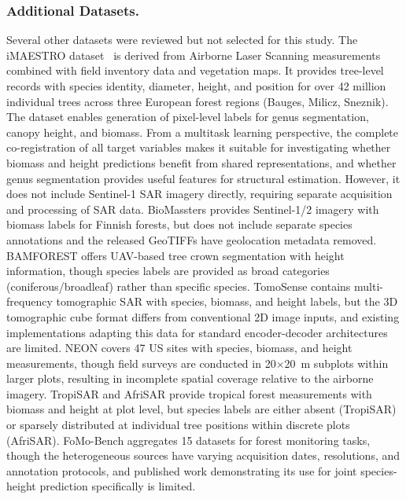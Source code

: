 \subsubsection{Additional Datasets.} 
Several other datasets were reviewed but not selected for this study. The iMAESTRO dataset~\cite{aussenac_diameter_2023} is derived from Airborne Laser Scanning measurements combined with field inventory data and vegetation maps. It provides tree-level records with species identity, diameter, height, and position for over 42 million individual trees across three European forest regions (Bauges, Milicz, Sneznik). The dataset enables generation of pixel-level labels for genus segmentation, canopy height, and biomass. From a multitask learning perspective, the complete co-registration of all target variables makes it suitable for investigating whether biomass and height predictions benefit from shared representations, and whether genus segmentation provides useful features for structural estimation. However, it does not include Sentinel-1 SAR imagery directly, requiring separate acquisition and processing of SAR data. BioMassters \cite{andrea_nascetti_biomassters_nodate} provides Sentinel-1/2 imagery with biomass labels for Finnish forests, but does not include separate species annotations and the released GeoTIFFs have geolocation metadata removed. BAMFOREST \cite{troles_bamforests_2024} offers UAV-based tree crown segmentation with height information, though species labels are provided as broad categories (coniferous/broadleaf) rather than specific species. TomoSense \cite{tebaldini_tomosense_2023} contains multi-frequency tomographic SAR with species, biomass, and height labels, but the 3D tomographic cube format differs from conventional 2D image inputs, and existing implementations adapting this data for standard encoder-decoder architectures are limited. NEON \cite{weinstein_remote_2021} covers 47 US sites with species, biomass, and height measurements, though field surveys are conducted in 20$\times$20~m subplots within larger plots, resulting in incomplete spatial coverage relative to the airborne imagery. TropiSAR \cite{dubois-fernandez_tropisar_2012} and AfriSAR \cite{fatoyinbo_nasa_2021} provide tropical forest measurements with biomass and height at plot level, but species labels are either absent (TropiSAR) or sparsely distributed at individual tree positions within discrete plots (AfriSAR). FoMo-Bench \cite{bountos_fomo_2025} aggregates 15 datasets for forest monitoring tasks, though the heterogeneous sources have varying acquisition dates, resolutions, and annotation protocols, and published work demonstrating its use for joint species-height prediction specifically is limited.

